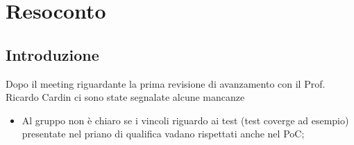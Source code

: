\section{Resoconto}
\subsection{Introduzione}
Dopo il meeting riguardante la prima revisione di avanzamento con il Prof. Ricardo Cardin ci sono state segnalate
alcune mancanze

\begin{itemize}
\item Al gruppo non è chiaro se i vincoli riguardo ai test (test coverge ad esempio) presentate nel priano di qualifica vadano rispettati anche nel PoC;

\end{itemize}